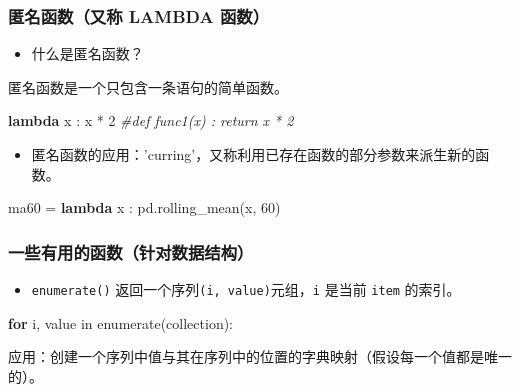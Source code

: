 \documentclass[]{ctexart}
\newenvironment{Shaded}{}{}
\newcommand{\KeywordTok}[1]{\textcolor[rgb]{0.00,0.44,0.13}{\textbf{{#1}}}}
\newcommand{\DecValTok}[1]{\textcolor[rgb]{0.25,0.63,0.44}{{#1}}}
\newcommand{\CommentTok}[1]{\textcolor[rgb]{0.38,0.63,0.69}{\textit{{#1}}}}
\newcommand{\ControlFlowTok}[1]{\textcolor[rgb]{0.00,0.44,0.13}{\textbf{{#1}}}}
\newcommand{\OperatorTok}[1]{\textcolor[rgb]{0.40,0.40,0.40}{{#1}}}
\newcommand{\BuiltInTok}[1]{{#1}}
\newcommand{\NormalTok}[1]{{#1}}
\begin{document}
\subsubsection{匿名函数（又称 LAMBDA 函数）}\label{header-n249}

\begin{itemize}
\item
  什么是匿名函数？
\end{itemize}

匿名函数是一个只包含一条语句的简单函数。

\begin{Shaded}
\begin{Highlighting}[]
\KeywordTok{lambda} \NormalTok{x : x }\OperatorTok{*} \DecValTok{2}
\CommentTok{#def func1(x) : return x * 2}
\end{Highlighting}
\end{Shaded}

\begin{itemize}
\item
  匿名函数的应用：'curring'，又称利用已存在函数的部分参数来派生新的函数。
\end{itemize}

\begin{Shaded}
\begin{Highlighting}[]
\NormalTok{ma60 }\OperatorTok{=} \KeywordTok{lambda} \NormalTok{x : pd.rolling_mean(x, }\DecValTok{60}\NormalTok{)}
\end{Highlighting}
\end{Shaded}

\subsubsection{一些有用的函数（针对数据结构）}\label{header-n262}

\begin{itemize}
\item
  \texttt{enumerate()} 返回一个序列\texttt{(i,\ value)}元组，\texttt{i}
  是当前 \texttt{item} 的索引。
\end{itemize}

\begin{Shaded}
\begin{Highlighting}[]
\ControlFlowTok{for} \NormalTok{i, value }\OperatorTok{in} \BuiltInTok{enumerate}\NormalTok{(collection):}
\end{Highlighting}
\end{Shaded}

应用：创建一个序列中值与其在序列中的位置的字典映射（假设每一个值都是唯一的）。
\end{document}
